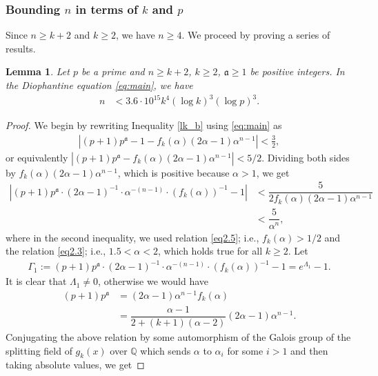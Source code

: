 \documentclass[11pt,a4paper]{article}
\newtheorem{lemma}[theorem]{Lemma}
\numberwithin{equation}{section}
\numberwithin{table}{section}
\numberwithin{figure}{section}
\begin{document}
\subsubsection{Bounding $n$ in terms of $k$ and $p$}
Since $ n\ge k+2$ and $k\ge 2$, we have $n\ge 4$. We proceed by proving a series of results.

\begin{lemma}\label{lem5.2} 
	Let $p$ be a prime and $n\ge k+2$, $k\ge 2$, $\mathfrak{a}\ge 1$ be positive integers.
	In the Diophantine equation \eqref{eq:main}, we have
	\begin{align*}
		n&<3.6\cdot 10^{15} k^{4}(\log k)^3 (\log p)^3 .
	\end{align*}
\end{lemma}
\begin{proof}
We begin by rewriting Inequality \eqref{lk_b} using \eqref{eq:main} as
\begin{align*}
	\left|(p+1)p^\mathfrak{a}-1 - f_k(\alpha)(2\alpha - 1)\alpha^{n - 1}\right| < \frac{3}{2}, 
\end{align*}
or equivalently $\left|(p+1)p^\mathfrak{a} - f_k(\alpha)(2\alpha - 1)\alpha^{n - 1}\right| < 5/2$.
Dividing both sides by $f_k(\alpha)(2\alpha-1)\alpha^{n-1}$, which is positive because $\alpha>1$, we get
\begin{align}\label{eq:lin-f1}
	\left|(p+1)p^\mathfrak{a}\cdot(2\alpha-1)^{-1}\cdot\alpha^{-(n-1)}\cdot(f_k(\alpha))^{-1}-1\right|&<\dfrac{5}{2f_k(\alpha)(2\alpha-1)\alpha^{n-1}}\nonumber\\
	&<\dfrac{5}{\alpha^{n}},
\end{align}
where in the second inequality, we used relation \eqref{eq2.5}; i.e., $f_k(\alpha)>1/2$ and the relation \eqref{eq2.3}; i.e., $1.5<\alpha<2$, which holds true for all $k\ge 2$. Let 
\begin{align*}
\Gamma_1:=(p+1)p^\mathfrak{a}\cdot(2\alpha-1)^{-1}\cdot\alpha^{-(n-1)}\cdot(f_k(\alpha))^{-1}-1=e^{\Lambda_1}-1.
\end{align*} 
It is clear that $\Lambda_1\ne 0$, otherwise we would have
\begin{align*}
	(p+1)p^\mathfrak{a} &= (2\alpha-1)\alpha^{n-1}f_k(\alpha)\nonumber\\
	&=\dfrac{\alpha-1}{2+(k+1)(\alpha-2)}	(2\alpha-1)\alpha^{n-1}.
\end{align*}
Conjugating the above relation by some automorphism of the Galois group of the splitting field of $g_k (x)$ over $\mathbb{Q}$ which sends $\alpha$ to $\alpha_i$ for some $i>1$ and then taking absolute values, we get 

\end{proof}
\end{document}
